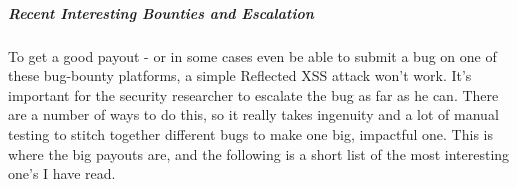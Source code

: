 \subparagraph{Recent Interesting Bounties and Escalation }
To get a good payout - or in some cases even be able to submit a bug on one of these bug-bounty platforms, a simple Reflected XSS attack won’t work.  It’s important for the security researcher to escalate the bug as far as he can.  There are a number of ways to do this, so it really takes ingenuity and a lot of manual testing to stitch together different bugs to make one big, impactful one.  This is where the big payouts are, and the following is a short list of the most interesting one’s I have read.  

	




